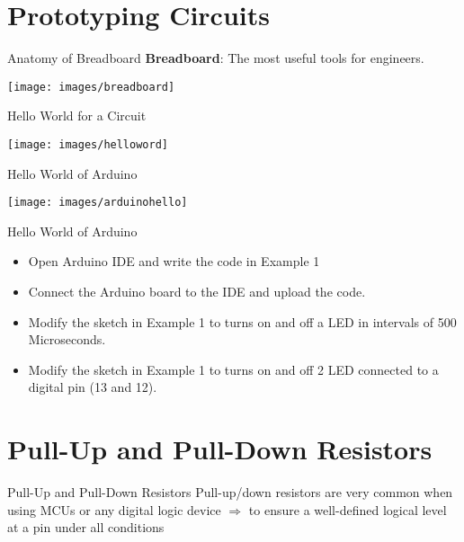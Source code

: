 \documentclass{beamer}
\begin{document}
\begin{darkframes}
\section{Prototyping Circuits}  

\begin{frame}[<+->]{Anatomy of Breadboard}
	\textbf{Breadboard}: The most useful tools for engineers. 
	\begin{center}
		\texttt{[image: images/breadboard]} 
	\end{center}
	
\end{frame}    
    

\begin{frame}[<+->]{Hello World for a Circuit}
	 
	\begin{center}
		\texttt{[image: images/helloword]} 
	\end{center}
	
\end{frame} 

\begin{frame}[<+->]{Hello World of Arduino}
	
	\begin{center}
		\texttt{[image: images/arduinohello]} 
	\end{center}
	
\end{frame}     

\begin{frame}{Hello World of Arduino}
	
	\begin{itemize}
		\item Open Arduino IDE and write the  code in Example 1
		\item Connect the Arduino board to the IDE and upload the code.
		\item Modify the sketch in Example 1  to turns on and off a LED in intervals of 500 Microseconds.
		\item Modify the sketch in Example 1  to turns on and off 2 LED connected to a digital pin (13 and 12).
	\end{itemize}
	
\end{frame}   


\section{Pull-Up and Pull-Down Resistors}
\begin{frame}[<+->]{Pull-Up and Pull-Down Resistors}
	Pull-up/down resistors are very common when using MCUs or any digital logic device $\Rightarrow$ to ensure a well-defined logical level at a pin under all conditions


\end{frame}
\end{darkframes}
\end{document}
